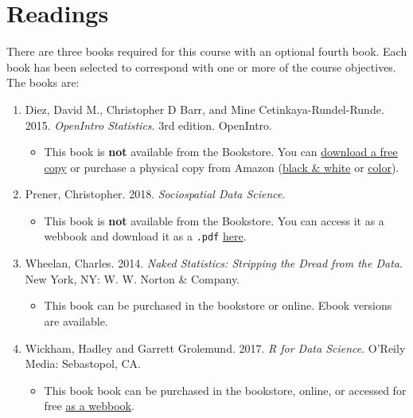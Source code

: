 \documentclass[]{book}
\providecommand{\tightlist}{%
  \setlength{\itemsep}{0pt}\setlength{\parskip}{0pt}}
\theoremstyle{definition}
\theoremstyle{definition}
\theoremstyle{definition}
\theoremstyle{remark}
\begin{document}
\section{Readings}\label{readings}

There are three books required for this course with an optional fourth
book. Each book has been selected to correspond with one or more of the
course objectives. The books are:

\begin{enumerate}
\def\labelenumi{\arabic{enumi}.}
\tightlist
\item
  Diez, David M., Christopher D Barr, and Mine Cetinkaya-Rundel-Runde.
  2015. \emph{OpenIntro Statistics}. 3rd edition. OpenIntro.

  \begin{itemize}
  \tightlist
  \item
    This book is \textbf{not} available from the Bookstore. You can
    \href{https://www.openintro.org/stat/textbook.php}{download a free
    copy} or purchase a physical copy from Amazon
    (\href{https://www.amazon.com/dp/1943450048/}{black \& white} or
    \href{https://www.amazon.com/dp/1943450056/}{color}).
  \end{itemize}
\item
  Prener, Christopher. 2018. \emph{Sociospatial Data Science}.

  \begin{itemize}
  \tightlist
  \item
    This book is \textbf{not} available from the Bookstore. You can
    access it as a webbook and download it as a \texttt{.pdf}
    \href{https://chris-prener.github.io/SSDSBook/}{here}.
  \end{itemize}
\item
  Wheelan, Charles. 2014. \emph{Naked Statistics: Stripping the Dread
  from the Data}. New York, NY: W. W. Norton \& Company.

  \begin{itemize}
  \tightlist
  \item
    This book can be purchased in the bookstore or online. Ebook
    versions are available.
  \end{itemize}
\item
  Wickham, Hadley and Garrett Grolemund. 2017. \emph{R for Data
  Science}. O'Reily Media: Sebastopol, CA.

  \begin{itemize}
  \tightlist
  \item
    This book book can be purchased in the bookstore, online, or
    accessed for free \href{http://r4ds.had.co.nz}{as a webbook}.
  \end{itemize}
\end{enumerate}
\end{document}
